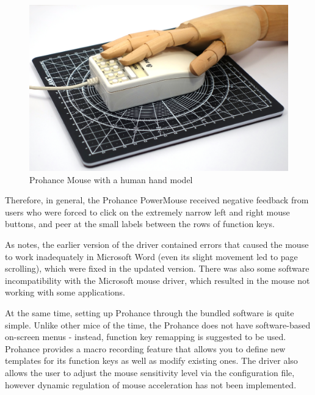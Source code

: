 \documentclass[11pt, a4paper]{article}
\begin{document}
\begin{figure}[h]
    \centering
    \includegraphics[scale=0.35]{1989_prohance_powermouse/hand_30.jpg}
    \caption{Prohance Mouse with a human hand model}
    \label{fig:ProhanceHand}
\end{figure}

Therefore, in general, the Prohance PowerMouse received negative feedback from users who were forced to click on the extremely narrow left and right mouse buttons, and peer at the small labels between the rows of function keys.

As \cite{prohance} notes, the earlier version of the driver contained errors that caused the mouse to work inadequately in Microsoft Word (even its slight movement led to page scrolling), which were fixed in the updated version. There was also some software incompatibility with the Microsoft mouse driver, which resulted in the mouse not working with some applications.

At the same time, setting up Prohance through the bundled software is quite simple. Unlike other mice of the time, the Prohance does not have software-based on-screen menus - instead, function key remapping is suggested to be used. Prohance provides a macro recording feature that allows you to define new templates for its function keys as well as modify existing ones.
The driver also allows the user to adjust the mouse sensitivity level via the configuration file, however dynamic regulation of mouse acceleration has not been implemented.
\end{document}
